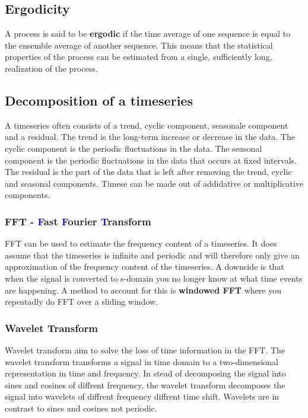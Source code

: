 \subsection{Ergodicity}
A process is said to be \textbf{ergodic} if the time average of one sequence is equal to the ensemble average of another sequence. This means that the statistical properties of the process can be estimated from a single, sufficiently long, realization of the process. \newline



\subsection {Decomposition of a timeseries}
A timeseries often consists of a trend, cyclic component, seasonale component and a residual. The trend is the long-term increase or decrease in the data. The cyclic component is the periodic fluctuations in the data. The seasonal component is the periodic fluctuations in the data that occurs at fixed intervals. The residual is the part of the data that is left after removing the trend, cyclic and seasonal components. Timese can be made out of addidative or multiplicative components. \newline


\subsubsection{FFT - \textcolor{blue}{F}ast \textcolor{blue}{F}ourier \textcolor{blue}{T}ransform}
FFT can be used to estimate the frequency content of a timeseries. It does assume that the timeseries is infinite and periodic and will therefore only give an approximation of the frequency content of the timeseries. A downside is that when the signal is converted to s-domain you no longer know at what time events are happening. A method to account for this is \textbf{windowed FFT} where you repeatadly do FFT over a sliding window. \newline

\subsubsection{Wavelet Transform}
Wavelet transform aim to solve the loss of time information in the FFT. The wavelet transform transforms a signal in time domain to a two-dimensional representation in time and frequency. In stead of decomposing the signal into sines and cosines of diffrent frequency, the wavelet transform decomposes the signal into wavelets of diffrent frequency  diffrent time shift. Wavelets are in contrast to sines and cosines not periodic. 


